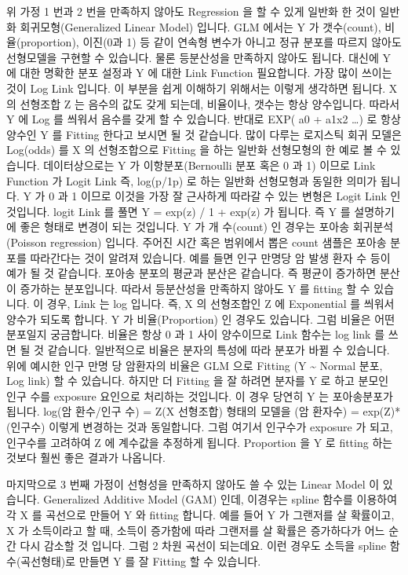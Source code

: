 \documentclass[letterpaper,10pt,english]{jupyterBook}
\begin{document}
\sphinxAtStartPar
위 가정 1 번과 2 번을 만족하지 않아도 Regression 을 할 수 있게 일반화 한 것이 일반화 회귀모형(Generalized Linear Model) 입니다. GLM 에서는 Y 가 갯수(count), 비율(proportion), 이진(0과 1) 등 같이 연속형 변수가 아니고 정규 분포를 따르지 않아도 선형모델을 구현할 수 있습니다. 물론 등분산성을 만족하지 않아도 됩니다. 대신에 Y 에 대한 명확한 분포 설정과 Y 에 대한 Link Function 필요합니다. 가장 많이 쓰이는 것이 Log Link 입니다. 이 부분을 쉽게 이해하기 위해서는 이렇게 생각하면 됩니다. X 의 선형조합 Z 는 음수의 값도 갖게 되는데, 비율이나, 갯수는 항상 양수입니다. 따라서 Y 에 Log 를 씌워서 음수를 갖게 할 수 있습니다. 반대로 EXP( a0 + a1x2 …) 로 항상 양수인 Y 를 Fitting 한다고 보시면 될 것 같습니다. 많이 다루는 로지스틱 회귀 모델은 Log(odds) 를 X 의 선형조합으로 Fitting 을 하는 일반화 선형모형의 한 예로 볼 수 있습니다. 데이터상으로는 Y 가 이항분포(Bernoulli 분포 혹은 0 과 1) 이므로 Link Function 가 Logit Link 즉, log(p/1\sphinxhyphen{}p) 로 하는 일반화 선형모형과 동일한 의미가 됩니다.  Y 가 0 과 1 이므로 이것을 가장 잘 근사하게 따라갈 수 있는 변형은 Logit Link 인 것입니다. logit Link 를 풀면 Y = exp(z) / 1 + exp(z) 가 됩니다. 즉 Y 를 설명하기에 좋은 형태로 변경이 되는 것입니다. Y 가  개 수(count) 인 경우는 포아송 회귀분석 (Poisson regression) 입니다. 주어진 시간 혹은 범위에서 뽑은 count 샘플은 포아송 분포를 따라간다는 것이 알려져 있습니다. 예를 들면 인구 만명당 암 발생 환자 수 등이 예가 될 것 같습니다. 포아송 분포의 평균과 분산은 같습니다. 즉 평균이 증가하면 분산이 증가하는 분포입니다. 따라서 등분산성을 만족하지 않아도 Y 를 fitting 할 수 있습니다. 이 경우, Link 는 log 입니다. 즉, X 의 선형조합인 Z 에 Exponential 를 씌워서 양수가 되도록 합니다. Y 가 비율(Proportion) 인 경우도 있습니다. 그럼 비율은 어떤 분포일지 궁금합니다. 비율은 항상 0 과 1 사이 양수이므로 Link 함수는 log link 를 쓰면 될 것 같습니다. 일반적으로 비율은 분자의 특성에 따라 분포가 바뀔 수 있습니다. 위에 예시한 인구 만명 당 암환자의 비율은 GLM 으로 Fitting (Y \textasciitilde{} Normal 분포, Log link) 할 수 있습니다. 하지만 더 Fitting 을 잘 하려면 분자를 Y 로 하고 분모인 인구 수를 exposure 요인으로 처리하는 것입니다. 이 경우 당연히 Y 는 포아송분포가 됩니다.  log(암 환수/인구 수) = Z(X 선형조합)  형태의 모델을 (암 환자수) = exp(Z)*(인구수) 이렇게 변경하는 것과 동일합니다. 그럼 여기서 인구수가 exposure 가 되고, 인구수를 고려하여 Z 에 계수값을 추정하게 됩니다. Proportion 을 Y 로  fitting 하는 것보다 훨씬 좋은 결과가 나옵니다.

\sphinxAtStartPar
마지막으로 3 번째 가정이 선형성을 만족하지 않아도 쓸 수 있는 Linear Model 이 있습니다.  Generalized Additive Model (GAM) 인데, 이경우는 spline 함수를 이용하여 각 X 를 곡선으로 만들어 Y 와 fitting 합니다. 예를 들어 Y 가 그랜저를 살 확률이고, X 가 소득이라고 할 때, 소득이 증가함에 따라 그랜저를 살 확률은 증가하다가 어느 순간 다시 감소할 것 입니다. 그럼 2 차원 곡선이 되는데요. 이런 경우도 소득을 spline 함수(곡선형태)로 만들면 Y 를 잘 Fitting 할 수 있습니다.
\end{document}
